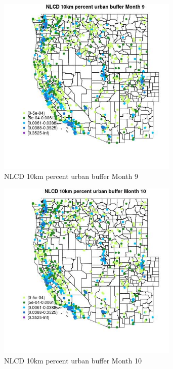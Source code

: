 \begin{figure} 
\centering  
\includegraphics[width=0.77\textwidth]{Code_Outputs/Report_ML_input_PM25_Step4_part_f_de_duplicated_aves_prioritize_24hr_obswNAs_MapObsMo9NLCD_10km_percent_urban_buffer.jpg} 
\caption{\label{fig:Report_ML_input_PM25_Step4_part_f_de_duplicated_aves_prioritize_24hr_obswNAsMapObsMo9NLCD_10km_percent_urban_buffer}NLCD 10km percent urban buffer Month 9} 
\end{figure} 
 

\clearpage 

\begin{figure} 
\centering  
\includegraphics[width=0.77\textwidth]{Code_Outputs/Report_ML_input_PM25_Step4_part_f_de_duplicated_aves_prioritize_24hr_obswNAs_MapObsMo10NLCD_10km_percent_urban_buffer.jpg} 
\caption{\label{fig:Report_ML_input_PM25_Step4_part_f_de_duplicated_aves_prioritize_24hr_obswNAsMapObsMo10NLCD_10km_percent_urban_buffer}NLCD 10km percent urban buffer Month 10} 
\end{figure} 
 

